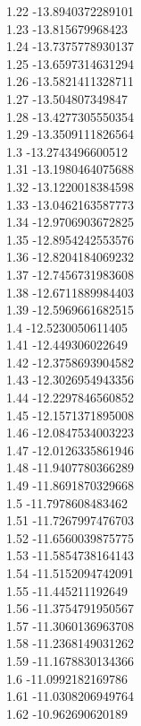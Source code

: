 {1.22	-13.8940372289101\\
1.23	-13.815679968423\\
1.24	-13.7375778930137\\
1.25	-13.6597314631294\\
1.26	-13.5821411328711\\
1.27	-13.504807349847\\
1.28	-13.4277305550354\\
1.29	-13.3509111826564\\
1.3	-13.2743496600512\\
1.31	-13.1980464075688\\
1.32	-13.1220018384598\\
1.33	-13.0462163587773\\
1.34	-12.9706903672825\\
1.35	-12.8954242553576\\
1.36	-12.8204184069232\\
1.37	-12.7456731983608\\
1.38	-12.6711889984403\\
1.39	-12.5969661682515\\
1.4	-12.5230050611405\\
1.41	-12.449306022649\\
1.42	-12.3758693904582\\
1.43	-12.3026954943356\\
1.44	-12.2297846560852\\
1.45	-12.1571371895008\\
1.46	-12.0847534003223\\
1.47	-12.0126335861946\\
1.48	-11.9407780366289\\
1.49	-11.8691870329668\\
1.5	-11.7978608483462\\
1.51	-11.7267997476703\\
1.52	-11.6560039875775\\
1.53	-11.5854738164143\\
1.54	-11.5152094742091\\
1.55	-11.445211192649\\
1.56	-11.3754791950567\\
1.57	-11.3060136963708\\
1.58	-11.2368149031262\\
1.59	-11.1678830134366\\
1.6	-11.0992182169786\\
1.61	-11.0308206949764\\
1.62	-10.962690620189\\
}
